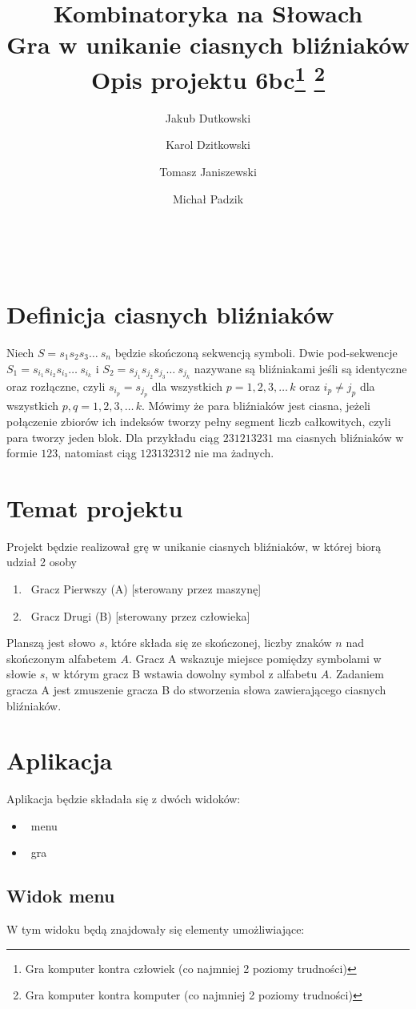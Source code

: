 \documentclass[11pt,a4paper]{article}
\author{Jakub Dutkowski}
\author{Karol Dzitkowski}
\author{Tomasz Janiszewski}
\author{Michał Padzik}
\affil{Wydział Matematyki i Nauk Informacyjnych, Politechnika Warszawska}
\title{
	Kombinatoryka na Słowach\\
	Gra w unikanie ciasnych bliźniaków\\
	Opis projektu
	6bc\footnote{Gra komputer kontra człowiek (co najmniej 2 poziomy trudności)}
\footnote{Gra komputer kontra komputer (co najmniej 2 poziomy trudności)}
 }
\begin{document}
\maketitle\
\newpage\


\section{Definicja ciasnych bliźniaków}
Niech $S = s_1 s_2 s_3 \ldots\ s_n$ będzie skończoną sekwencją symboli. Dwie pod-sekwencje
$S_1 = s_{i_1} s_{i_2} s_{i_3} \ldots\ s_{i_k}$ i $S_2 = s_{j_1} s_{j_2} s_{j_3} \ldots\ s_{j_k}$
nazywane są bliźniakami jeśli są identyczne oraz rozłączne, czyli $s_{i_p} = s_{j_p}$ dla
wszystkich $p = {1, 2, 3, \ldots\, k}$ oraz $ i_p \neq j_p $ dla wszystkich $ p,q = {1, 2, 3, \ldots\, k}$.
Mówimy że para bliźniaków jest ciasna, jeżeli połączenie zbiorów ich indeksów tworzy pełny segment
liczb całkowitych, czyli para tworzy jeden blok. Dla przykładu ciąg $231213231$ ma ciasnych bliźniaków
w formie $123$, natomiast ciąg $123132312$ nie ma żadnych.

\section{Temat projektu}
Projekt będzie realizował grę w unikanie ciasnych bliźniaków,
w której biorą udział 2 osoby
\begin{enumerate}
	\item\ Gracz Pierwszy (A) [sterowany przez maszynę]
	\item\ Gracz Drugi (B) [sterowany przez człowieka]
\end{enumerate}
Planszą jest słowo $s$, które składa się ze skończonej,
liczby znaków $n$ nad skończonym alfabetem $A$.
Gracz A wskazuje miejsce pomiędzy symbolami w słowie $s$, w którym gracz B
wstawia dowolny symbol z alfabetu $A$.
Zadaniem gracza A jest zmuszenie gracza B do stworzenia
słowa zawierającego ciasnych bliźniaków.

\section{Aplikacja}
Aplikacja będzie składała się z dwóch widoków:
\begin{itemize}
 \item\ menu
 \item\ gra
\end{itemize}

\subsection{Widok menu}
W tym widoku będą znajdowały się elementy umożliwiające:
\end{document}
